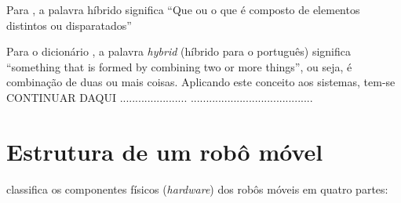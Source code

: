 Para , a palavra híbrido significa 
\textquotedblleft Que ou o que é composto de elementos distintos ou disparatados\textquotedblright

Para o dicionário , a palavra \textit{hybrid} (híbrido para o português) significa 
\textquotedblleft something that is formed by combining two or more things\textquotedblright, ou seja, é combinação de duas ou 
mais coisas. Aplicando este conceito aos sistemas, tem-se CONTINUAR DAQUI ...................... 
........................................




\vspace{2cm} %
\section{Estrutura de um robô móvel} \label{cap:sensores}




 classifica os componentes físicos (\textit{hardware}) dos robôs móveis em quatro partes:

